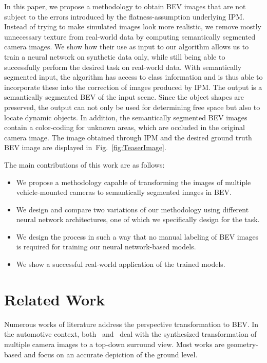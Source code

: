\documentclass[a4paper, 10pt, conference]{ieeeconf}
\newcommand{\fig}[1]{Fig.~\ref{#1}}
\begin{document}
In this paper, we propose a methodology to obtain BEV images that are not subject to the errors introduced by the flatness-assumption underlying IPM. Instead of trying to make simulated images look more realistic, we remove mostly unnecessary texture from real-world data by computing semantically segmented camera images. We show how their use as input to our algorithm allows us to train a neural network on synthetic data only, while still being able to successfully perform the desired task on real-world data. With semantically segmented input, the algorithm has access to class information and is thus able to incorporate these into the correction of images produced by IPM. The output is a semantically segmented BEV of the input scene. Since the object shapes are preserved, the output can not only be used for determining free space but also to locate dynamic objects. In addition, the semantically segmented BEV images contain a color-coding for unknown areas, which are occluded in the original camera image. The image obtained through IPM and the desired ground truth BEV image are displayed in~\fig{fig:TeaserImage}.

The main contributions of this work are as follows:
\begin{itemize}
  \item We propose a methodology capable of transforming the images of multiple vehicle-mounted cameras to semantically segmented images in BEV.
  \item We design and compare two variations of our methodology using different neural network architectures, one of which we specifically design for the task.
  \item We design the process in such a way that no manual labeling of BEV images is required for training our neural network-based models.
  \item We show a successful real-world application of the trained models.
\end{itemize}


\section{Related Work}

Numerous works of literature address the perspective transformation to BEV. In the automotive context, both~\cite{SungEtAl_DevelopmentImageSynthesis_2012} and~\cite{ZhangEtAl_SurroundViewCamera_2014} deal with the synthesized transformation of multiple camera images to a top-down surround view. Most works are geometry-based and focus on an accurate depiction of the ground level.
\end{document}
